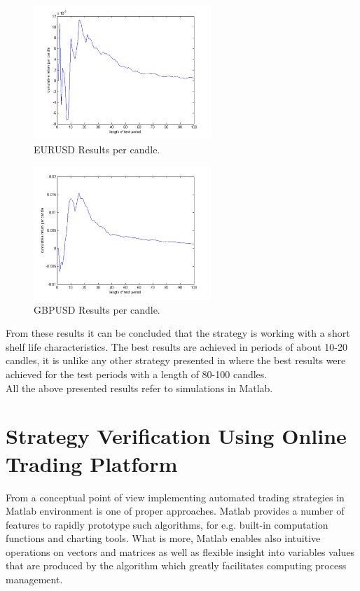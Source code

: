 \documentclass[runningheads,a4paper]{llncs}
\begin{document}
\begin{figure}[h!]
\centering
\includegraphics[width = 0.6\textwidth]{figures/rys10.png}
\caption{EURUSD Results per candle.}
\label{fig:fig10}
\end{figure}
\FloatBarrier

\begin{figure}[h!]
\centering
\includegraphics[width = 0.6\textwidth]{figures/rys11.png}
\caption{GBPUSD Results per candle.}
\label{fig:fig11}
\end{figure}
\FloatBarrier

From these results it can be concluded that the strategy is working with a short shelf life characteristics. The best results are achieved in periods of about 10-20 candles, it is unlike any other strategy presented in \cite{Wilinski2014} where the best results were achieved for the test periods with a length of 80-100 candles.\\
All the above presented results refer to simulations in Matlab.

\section{Strategy Verification Using Online Trading Platform}
From a conceptual point of view implementing automated trading strategies in Matlab environment is one of proper approaches. Matlab provides a number of features to rapidly prototype such algorithms, for e.g. built-in computation functions and charting tools. What is more, Matlab enables also intuitive operations on vectors and matrices as well as flexible insight into variables values that are produced by the algorithm which greatly facilitates computing process management.\\
\end{document}
